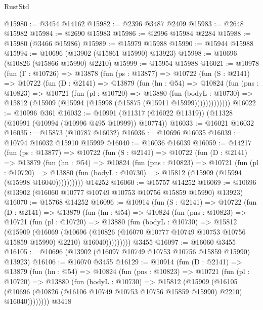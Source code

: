 \begin{lexlean}{RustStd}
\begin{coremodule}
@15980 := @3454 @14162
@15982 := @2396 @3487 @2409
@15983 := @2648 @15982
@15984 := @2690 @15983
@15986 := @2996 @15984 @2284
@15988 := @15980 (@3466 @15986)
@15989 := @15979 @15988
@15990 := @15944 @15988
@15994 := @10696 (@13902 (@15861 @15990) @13923)
@15998 := @10696 (@10826 (@15866 @15990) @2210)
@15999 := @15954 @15988
@16021 := @10978
    (fun (Γ : @10726) =>
    @13878
      (fun (ps : @13877) =>
      @10722
        (fun (S : @2141) =>
        @10722
          (fun (D : @2141) =>
          @13879
            (fun (hn : @54) =>
            @10824
              (fun (pns : @10823) =>
              @10721
                (fun (pl : @10720) =>
                @13880
                  (fun (bodyL : @10730) =>
                  @15812 (@15909 (@15994 (@15998 (@15875 (@15911 @15999)))))))))))))
@16022 := @10996 @361
@16032 := @10991 (@11317 (@16022 @11319)) (@11328 (@10991 (@10994 (@10996 @495 @10999)) @10774))
@16033 := @16021 @16032
@16035 := @15873 (@10787 @16032)
@16036 := @10696 @16035
@16039 := @10794 @16032 @15910 @15999
@16040 := @16036 @16039
@16059 := @14217
    (fun (ps : @13877) =>
    @10722
      (fun (S : @2141) =>
      @10722
        (fun (D : @2141) =>
        @13879
          (fun (hn : @54) =>
          @10824
            (fun (pns : @10823) =>
            @10721
              (fun (pl : @10720) =>
              @13880 (fun (bodyL : @10730) => @15812 (@15909 (@15994 (@15998 @16040))))))))))
    @14252
@16060 := @15757 @14252
@16069 := @10696 (@13902 (@16060 @10777 @10749 @10753 @10756 @15859 @15990) @13923)
@16070 := @15768 @14252
@16096 := @10914
    (fun (S : @2141) =>
    @10722
      (fun (D : @2141) =>
      @13879
        (fun (hn : @54) =>
        @10824
          (fun (pns : @10823) =>
          @10721
            (fun (pl : @10720) =>
            @13880
              (fun (bodyL : @10730) =>
              @15812
                (@15909
                  (@16069
                    (@10696
                      (@10826 (@16070 @10777 @10749 @10753 @10756 @15859 @15990) @2210)
                      @16040)))))))))
    @3455
@16097 := @16060 @3455
@16105 := @10696 (@13902 (@16097 @10749 @10753 @10756 @15859 @15990) @13923)
@16106 := @16070 @3455
@16129 := @10914
    (fun (D : @2141) =>
    @13879
      (fun (hn : @54) =>
      @10824
        (fun (pns : @10823) =>
        @10721
          (fun (pl : @10720) =>
          @13880
            (fun (bodyL : @10730) =>
            @15812
              (@15909
                (@16105
                  (@10696 (@10826 (@16106 @10749 @10753 @10756 @15859 @15990) @2210) @16040))))))))
    @3418

\end{coremodule}
\end{lexlean}
